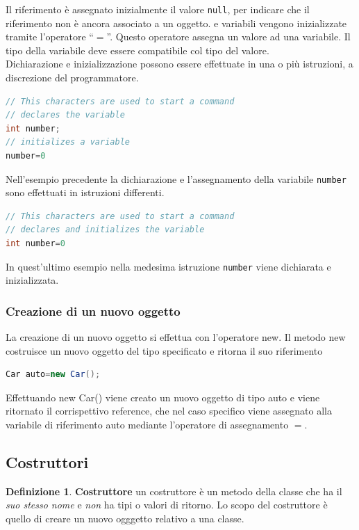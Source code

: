 \documentclass{article}
\theoremstyle{definition}
\newtheorem{mydef}{Definizione}
\begin{document}
Il riferimento \`e assegnato inizialmente il valore \texttt{null}, per indicare che il riferimento non \`e ancora associato a un oggetto.
e variabili vengono inizializzate tramite l'operatore ``$=$''. Questo operatore assegna un valore ad una variabile.
Il tipo della variabile deve essere compatibile col tipo del valore.\\
Dichiarazione e inizializzazione possono essere effettuate in una o  pi\`u istruzioni, a discrezione
del programmatore.
\begin{lstlisting}[language=Java,escapechar=|]
// This characters are used to start a command
// declares the variable
int number;
// initializes a variable
number=0
\end{lstlisting}
Nell'esempio precedente la dichiarazione e l'assegnamento della variabile \texttt{number} sono
effettuati in istruzioni differenti.
\begin{lstlisting}[language=Java,escapechar=|]
// This characters are used to start a command
// declares and initializes the variable
int number=0
\end{lstlisting}
In quest'ultimo esempio nella medesima istruzione \texttt{number} viene dichiarata e inizializzata.

\subsubsection{Creazione di un nuovo oggetto}
La creazione di un nuovo oggetto si effettua con l'operatore new. Il metodo new costruisce un nuovo oggetto del tipo specificato e ritorna il suo riferimento
\begin{lstlisting}[language=Java,escapechar=|]
Car auto=new Car();
\end{lstlisting}
Effettuando new Car() viene creato un nuovo oggetto di tipo auto e viene ritornato il corrispettivo reference, che nel caso specifico viene assegnato alla variabile di riferimento auto mediante l'operatore di assegnamento $=$.

\subsection{Costruttori}
\begin{mydef} \textbf{Costruttore} un costruttore \`e un metodo della classe che ha il \emph{suo stesso nome} e \emph{non} ha tipi o valori di ritorno. Lo scopo del costruttore \`e quello di creare un nuovo ogggetto relativo a una classe.
\end{mydef}
\end{document}
